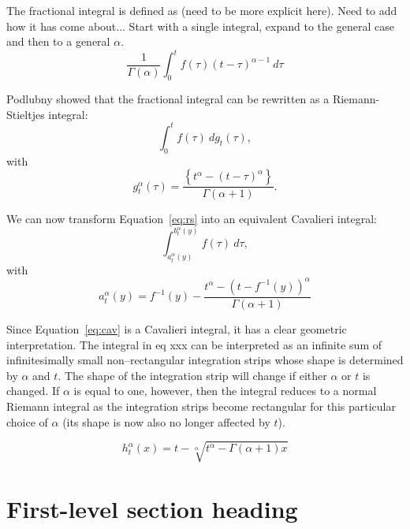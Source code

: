 \documentclass{article}
\theoremstyle{theorem}
\theoremstyle{definition}
\begin{document}
The fractional integral is defined as (need to be more explicit here). Need to add how it has come about... Start with a single integral, expand to the general case and then 
to a general $\alpha$. 
\begin{equation}
\frac{1}{\Gamma(\alpha)}\int_{0}^{t}f(\tau)(t-\tau)^{\alpha-1}~d\tau
\end{equation}

Podlubny showed that the fractional integral can be rewritten as a Riemann-Stieltjes integral:
\begin{equation}
\label{eq:rs}
\int_0^{t} f(\tau)~dg_t(\tau),
\end{equation}
with 
\begin{equation}
g_t^{\alpha}(\tau) = \frac{\left \{t^{\alpha} - (t-\tau)^{\alpha} \right \}}{\Gamma(\alpha+1)}. 
\end{equation}

We can now transform Equation~\ref{eq:rs} into an equivalent Cavalieri integral:
\begin{equation}
\label{eq:cav}
\int_{a_t^{\alpha}(y)}^{b_t^{\alpha}(y)} f(\tau)~d\tau, 
\end{equation}
with
\begin{equation}
a_t^{\alpha}(y) = f^{-1}(y) - \frac{t^{\alpha}-(t-f^{-1}(y))^{\alpha}}{\Gamma(\alpha+1)}
\end{equation}

Since Equation~\ref{eq:cav} is a Cavalieri integral, it has a clear geometric interpretation. The integral in eq xxx can be interpreted as an infinite
sum of infinitesimally small non–rectangular integration strips whose shape is determined by $\alpha$ and $t$. The shape of the integration 
strip will change if either $\alpha$ or $t$ is changed. If $\alpha$ is equal to one, however, then the integral 
reduces to a normal Riemann integral as the integration strips become rectangular for this particular choice of $\alpha$ (its shape is now also no longer affected by $t$).

\begin{equation}
h_t^{\alpha}(x) = t - \sqrt[\alpha]{t^{\alpha} - \Gamma(\alpha+1)x}
\end{equation}







\section{First-level section heading}
\end{document}
